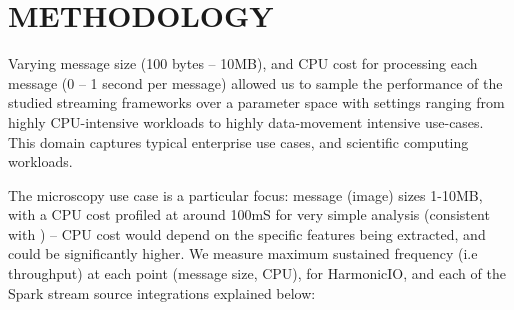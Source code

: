 \documentclass[conference]{IEEEtran}
\begin{document}
\section{METHODOLOGY}\label{method}


Varying message size (100 bytes -- 10MB), and CPU cost for processing each message (0 -- 1 second per message)
allowed us to sample the performance of the studied streaming frameworks over a parameter space with settings ranging from highly CPU-intensive workloads to highly data-movement intensive use-cases. This domain captures typical enterprise use cases, and scientific computing workloads.





The microscopy use case is a particular focus: message (image) sizes 1-10MB, with a CPU cost profiled at around 100mS for very simple analysis (consistent with \cite{torruangwatthanaHarmonicIOScalableData2018}) -- CPU cost would depend on the specific features being extracted, and could be significantly higher.
We measure maximum sustained frequency (i.e throughput) at each point (message size, CPU), for HarmonicIO, and each of the Spark stream source integrations explained below:%
\end{document}
